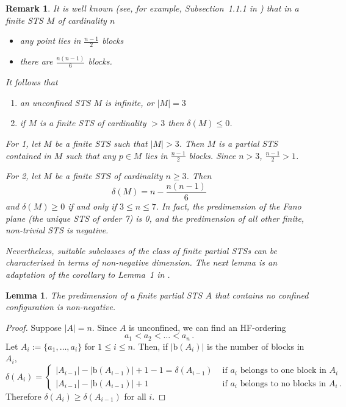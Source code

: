 \documentclass[a4paper, 11pt]{article}
\theoremstyle{note}
\newtheorem{lemma}[thm]{Lemma}
\newtheorem{rmk}[thm]{Remark}
\begin{document}
\begin{rmk} It is well known  (see, for example, Subsection~1.1.1 in \cite{colbournrosa}) that in a finite STS $M$ of cardinality $n$
\begin{itemize}
\item any point lies in $\frac{n-1}{2}$ blocks
\item there are $\frac{n(n-1)}{6}$ blocks.
\end{itemize}

It follows that 
\begin{enumerate}
\item an unconfined STS $M$ is infinite, or $|M|=3$
\item if $M$ is  a finite STS of cardinality $> 3$ then  $\delta(M)\leq 0$.
\end{enumerate}

For 1, let $M$ be a finite STS such that $|M| > 3$. Then $M$ is a partial STS contained in $M$ such that any $p \in M$ lies in $\frac{n-1}{2}$ blocks. Since $n>3$, $\frac{n-1}{2}>1$.

For 2, let $M$ be a finite STS of cardinality $n \geq 3$. Then 
\[ \delta(M) = n - \dfrac{n(n-1)}{6} \]
and $\delta(M) \geq 0$ if and only if $3 \leq n \leq 7$. In fact, the predimension of the Fano plane (the unique STS of order 7) is 0, and the predimension of all other finite, non-trivial STS is negative.

Nevertheless, suitable subclasses of the class of finite partial STSs  can be characterised in terms of non-negative dimension. The next lemma is an adaptation of the corollary to Lemma~1 in \cite{sieben}. 
\end{rmk}

\begin{lemma} The predimension of a finite partial STS $A$ that contains no confined configuration is non-negative. \end{lemma}
\begin{proof} 
Suppose $|A|=n$. Since $A$ is unconfined, we can find an HF-ordering %
\[a_1 < a_2 < \ldots < a_n \, .\]
Let $A_i:= \{a_1, \ldots, a_i \}$ for $1 \leq i \leq n$. Then, if  $|\mathrm{b}(A_i)|$ is the number of blocks in $A_i$,
$$ \delta(A_i)= \begin{cases} |A_{i-1}|- |\mathrm{b}(A_{i-1})| +1 -1 = \delta(A_{i-1}) & \mbox{ if $a_i$ belongs to one block in } A_i \\
|A_{i-1}|- |\mathrm{b}(A_{i-1})| +1 & \mbox{ if $a_i$ belongs to no blocks in } A_i \, .\end{cases} $$
Therefore $\delta(A_i) \geq \delta(A_{i-1})$ for all $i$. 
\end{proof}
\end{document}
